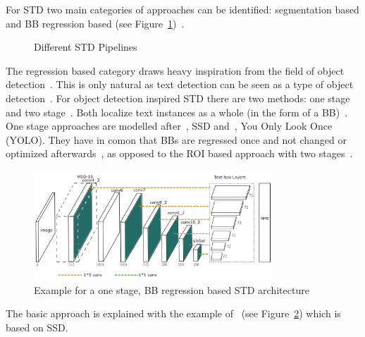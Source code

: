 For \ac{STD} two main categories of approaches can be identified: segmentation based and \ac{BB}
regression based (see
Figure~\ref{fig:STD-pipelines})~\citep{long_scene_2021,sheng_centripetaltext_2021,liu_accurate_2020}.
\begin{figure}[ht]
    \centering
    
    \caption{Different STD Pipelines\label{fig:STD-pipelines}}
\end{figure}
The regression based category draws heavy inspiration from the field of object
detection~\citep{long_scene_2021,liu_accurate_2020}.
This is only natural as text detection can be seen as a type of object
detection~\citep{liu_accurate_2020,long_scene_2021}.
For object detection inspired \ac{STD} there are two methods: one stage and two
stage~\citep{long_scene_2021}.
Both localize text instances as a whole (in the form of a
\ac{BB})~\citep{long_scene_2021,sheng_centripetaltext_2021}.
One stage approaches are modelled after~\cite{liu_ssd_2016}, \ac{SSD} and~\cite{redmon_you_2016},
You Only Look Once (YOLO).
They have in comon that \acp{BB} are regressed once and not changed or optimized
afterwards~\citep{redmon_you_2016,liu_ssd_2016}, as opposed to the \ac{ROI} based approach with two
stages~\citep{girshick_rich_2014}.
\begin{figure}[ht]
    \centering
    \includegraphics[width=0.8\textwidth]{img/STD-seg-free-Liao-TextBoxes-2017.png}
    \caption[One stage, BB regression based STD architecture]{%
        Example for a one stage, BB regression based STD
        architecture~\citep{liao_textboxes_2017}\label{fig:STD-segfree-ssd}
    }
\end{figure}
The basic approach is explained with the example of~\cite{liao_textboxes_2017} (see
Figure~\ref{fig:STD-segfree-ssd}) which is based on \ac{SSD}.
